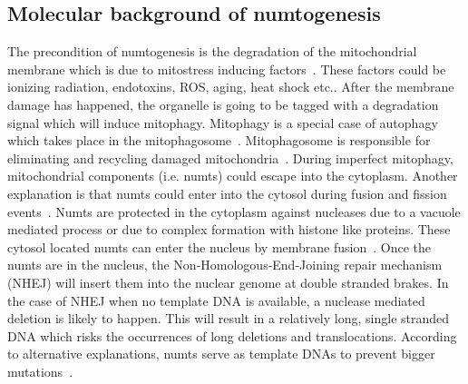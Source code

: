 \documentclass[a4paper,12pt]{article}
\numberwithin{equation}{section} %
\begin{document}
\subsection{Molecular background of numtogenesis}
\indent The precondition of numtogenesis is the degradation of the mitochondrial membrane which is due to mitostress inducing factors~. These factors could be ionizing radiation, endotoxins, ROS, aging, heat shock etc.. After the membrane damage has happened, the organelle is going to be tagged with a degradation signal which will induce mitophagy. Mitophagy is a special case of autophagy which takes place in the mitophagosome~. Mitophagosome is responsible for eliminating and recycling damaged mitochondria~. During imperfect mitophagy, mitochondrial components (i.e. numts) could escape into the cytoplasm. Another explanation is that numts could enter into the cytosol during fusion and fission events~. Numts are protected in the cytoplasm against nucleases due to a vacuole mediated process or due to complex formation with histone like proteins. These cytosol located numts can enter the nucleus by membrane fusion~. Once the numts are in the nucleus, the Non-Homologous-End-Joining repair mechanism (NHEJ) will insert them into the nuclear genome at double stranded brakes. In the case of NHEJ when no template DNA is available, a nuclease mediated deletion is likely to happen. This will result in a relatively long, single stranded DNA which risks the occurrences of long deletions and translocations. According to alternative explanations, numts serve as template DNAs to prevent bigger mutations~.
\end{document}

